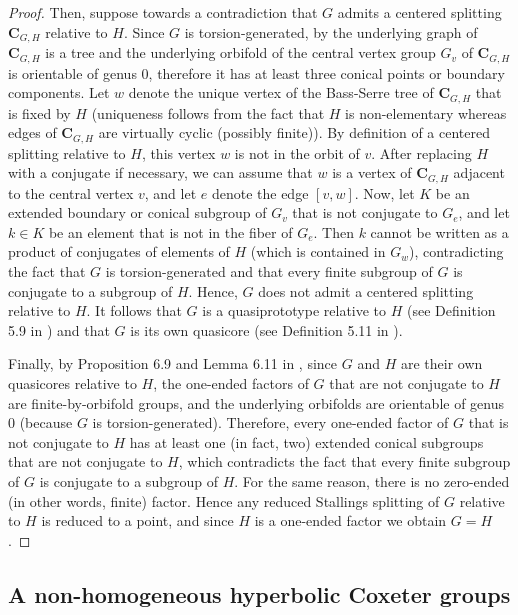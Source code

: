 \documentclass[a4paper, 11pt]{amsart}
\theoremstyle{definition}
\theoremstyle{remark}
\begin{document}
\begin{proof}
\smallskip \noindent
Then, suppose towards a contradiction that $G$ admits a centered splitting $\mathbf{C}_{G,H}$ relative to $H$. Since $G$ is torsion-generated, by \cite[Lemma 5.9]{AP24} the underlying graph of $\mathbf{C}_{G,H}$ is a tree and the underlying orbifold of the central vertex group $G_v$ of $\mathbf{C}_{G,H}$ is orientable of genus 0, therefore it has at least three conical points or boundary components. Let $w$ denote the unique vertex of the Bass-Serre tree of $\mathbf{C}_{G,H}$ that is fixed by $H$ (uniqueness follows from the fact that $H$ is non-elementary whereas edges of $\mathbf{C}_{G,H}$ are virtually cyclic (possibly finite)). By definition of a centered splitting relative to $H$, this vertex $w$ is not in the orbit of $v$. After replacing $H$ with a conjugate if necessary, we can assume that $w$ is a vertex of $\mathbf{C}_{G,H}$ adjacent to the central vertex $v$, and let $e$ denote the edge $[v,w]$. Now, let $K$ be an extended boundary or conical subgroup of $G_v$ that is not conjugate to $G_e$, and let $k\in K$ be an element that is not in the fiber of $G_e$. Then $k$ cannot be written as a product of conjugates of elements of $H$ (which is contained in $G_w$), contradicting the fact that $G$ is torsion-generated and that every finite subgroup of $G$ is conjugate to a subgroup of $H$. Hence, $G$ does not admit a centered splitting relative to $H$. It follows that $G$ is a quasiprototype relative to $H$ (see Definition 5.9 in \cite{And18}) and that $G$ is its own quasicore (see Definition 5.11 in \cite{And18}).

\smallskip \noindent
Finally, by Proposition 6.9 and Lemma 6.11 in \cite{And18}, since $G$ and $H$ are their own quasicores relative to $H$, the one-ended factors of $G$ that are not conjugate to $H$ are finite-by-orbifold groups, and the underlying orbifolds are orientable of genus 0 (because $G$ is torsion-generated). Therefore, every one-ended factor of $G$ that is not conjugate to $H$ has at least one (in fact, two) extended conical subgroups that are not conjugate to $H$, which contradicts the fact that every finite subgroup of $G$ is conjugate to a subgroup of $H$. For the same reason, there is no zero-ended (in other words, finite) factor. Hence any reduced Stallings splitting of $G$ relative to $H$ is reduced to a point, and since $H$ is a one-ended factor we obtain $G=H$.\end{proof}

\subsection{A non-homogeneous hyperbolic Coxeter groups}\label{example}
\end{document}
